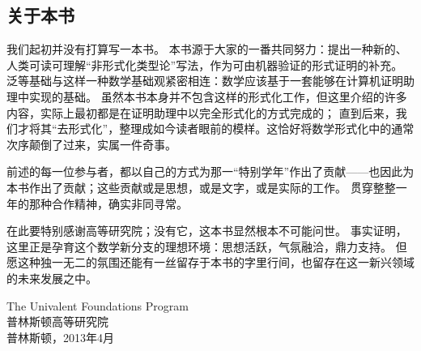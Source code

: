 \subsection*{关于本书}

我们起初并没有打算写一本书。
本书源于大家的一番共同努力：提出一种新的、人类可读可理解“非形式化类型论”写法，作为可由机器验证的形式证明的补充。
泛等基础与这样一种数学基础观紧密相连：数学应该基于一套能够在计算机证明助理中实现的基础。
虽然本书本身并不包含这样的形式化工作，但这里介绍的许多内容，实际上最初都是在证明助理中以完全形式化的方式完成的；
直到后来，我们才将其“去形式化”，整理成如今读者眼前的模样。这恰好将数学形式化中的通常次序颠倒了过来，实属一件奇事。

前述的每一位参与者，都以自己的方式为那一“特别学年”作出了贡献——也因此为本书作出了贡献；这些贡献或是思想，或是文字，或是实际的工作。
贯穿整整一年的那种合作精神，确实非同寻常。

\mentalpause

在此要特别感谢高等研究院；没有它，这本书显然根本不可能问世。
事实证明，这里正是孕育这个数学新分支的理想环境：思想活跃，气氛融洽，鼎力支持。
但愿这种独一无二的氛围还能有一丝留存于本书的字里行间，也留存在这一新兴领域的未来发展之中。

\bigskip

\begin{flushright}
The Univalent Foundations Program\\
普林斯顿高等研究院\\
普林斯顿，2013年4月
\end{flushright}

